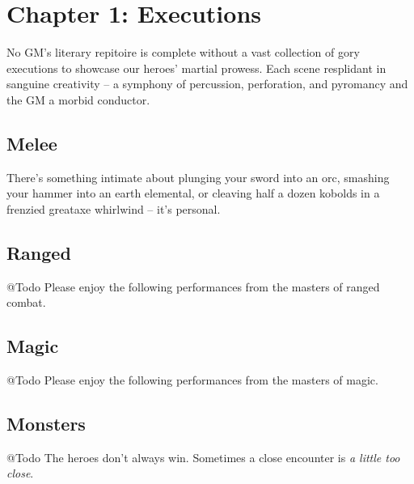 \chapter{Chapter 1: Executions}
No GM's literary repitoire is complete without a vast collection of gory executions to showcase our heroes' martial prowess. Each scene resplidant 
in sanguine creativity -- a symphony of percussion, perforation, and pyromancy and the GM a morbid conductor.

\section{Melee}
There's something intimate about plunging your sword into an orc, smashing your hammer into an earth elemental, or cleaving half a dozen kobolds in a frenzied greataxe whirlwind -- it's personal.





\section{Ranged}
@Todo Please enjoy the following performances from the masters of ranged combat.




\section{Magic}
@Todo Please enjoy the following performances from the masters of magic.




\section{Monsters}
@Todo The heroes don't always win. Sometimes a close encounter is \textit{a little too close}.




